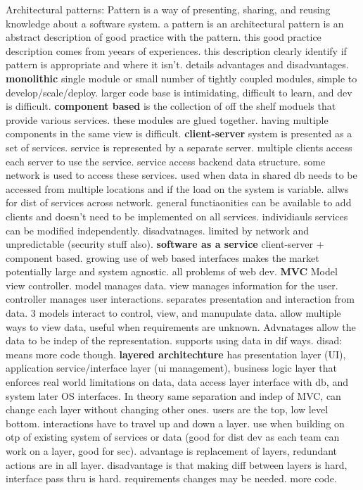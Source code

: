 \documentclass[10pt]{article}
\begin{document}
\begin{landscape}
\begin{multicols*}{6}
Architectural patterns: Pattern is a way of presenting, sharing, and reusing knowledge about a software system. a pattern is an architectural pattern is an abstract description of good practice with the pattern. this good practice description comes from yeears of experiences. this description clearly identify if pattern is appropriate and where it isn't. details advantages and disadvantages. \textbf{monolithic} single module or small number of tightly coupled modules, simple to develop/scale/deploy. larger code base is intimidating, difficult to learn, and dev is difficult. \textbf{component based} is the collection of off the  shelf moduels that provide various services. these modules are glued together. having multiple components in the same view is difficult. \textbf{client-server} system is presented as a set of services. service is represented by a separate server. multiple clients access each server to use the service. service access backend data structure. some network is used to access these services. used when data in shared db needs to be accessed from multiple locations and if the load on the system is variable. allws for dist of services across network. general functiaonities can be available to add clients and doesn't need to be implemented on all services. individiauls services can be modified independently. disadvatnages. limited by network and unpredictable (security stuff also). \textbf{software as a service} client-server + component based. growing use of web based interfaces makes the market potentially large and system agnostic. all problems of web dev. \textbf{MVC} Model view controller. model manages data. view manages information for the user. controller manages user interactions. separates presentation and interaction from data. 3 models interact to control, view, and manupulate data. allow multiple ways to view data, useful when requirements are unknown. Advnatages allow the data to be indep of the representation. supports using data in dif ways. disad: means more code though. \textbf{layered architechture} has presentation layer (UI), application service/interface layer (ui management), business logic layer that enforces real world limitations on data, data access layer interface with db, and system later OS interfaces. In theory same separation and indep of MVC, can change each layer without changing other ones. users are the top, low level bottom. interactions have to travel up and down a layer. use when building on otp of existing system of services or data (good for dist dev as each team can work on a layer, good for sec). advantage is replacement of layers, redundant actions are in all layer. disadvantage is that making diff between layers is hard, interface pass thru is hard. requirements changes may be needed. more code.

\end{multicols*}
\end{landscape}
\end{document}
